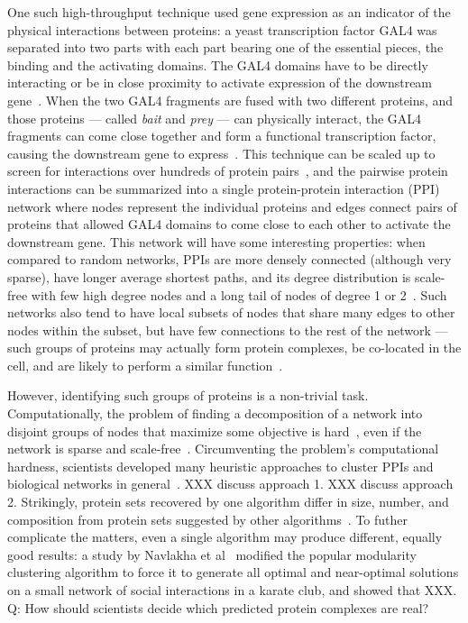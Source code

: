 One such high-throughput technique used gene expression as an indicator of the physical interactions between proteins: a yeast transcription factor GAL4 was separated into two parts with each part bearing one of the essential pieces, the binding and the activating domains. The GAL4 domains have to be directly interacting or be in close proximity to activate expression of the downstream gene~\cite{XXX}. When the two GAL4 fragments are fused with two different proteins, and those proteins --- called \textit{bait} and \textit{prey} --- can physically interact, the GAL4 fragments can come close together and form a functional transcription factor, causing the downstream gene to express~\cite{XXX}. This technique can be scaled up to screen for interactions over hundreds of protein pairs~\cite{Ito2001}, and the pairwise protein interactions can be summarized into a single protein-protein interaction (PPI) network where nodes represent the individual proteins and edges connect pairs of proteins that allowed GAL4 domains to come close to each other to activate the downstream gene. This network will have some interesting properties: when compared to random networks, PPIs are more densely connected (although very sparse), have longer average shortest paths, and its degree distribution is scale-free with few high degree nodes and a long tail of nodes of degree 1 or 2~\cite{Zhu2007}. Such networks also tend to have local subsets of nodes that share many edges to other nodes within the subset, but have few connections to the rest of the network --- such groups of proteins may actually form protein complexes, be co-located in the cell, and are likely to perform a similar function~\cite{ProteinComplexesPPI}.



However, identifying such groups of proteins is a non-trivial task. Computationally, the problem of finding a decomposition of a network into disjoint groups of nodes that maximize some objective is hard~\cite{ModularityNPhard}, even if the network is sparse and scale-free~\cite{XXX}. Circumventing the problem's computational hardness, scientists developed many heuristic approaches to cluster PPIs and biological networks in general~\cite{ReviewBiologicalNetworksclustering}. XXX discuss approach 1. XXX discuss approach 2. Strikingly, protein sets recovered by one algorithm differ in size, number, and composition from protein sets suggested by other algorithms~\cite{blah}. To futher complicate the matters, even a single algorithm may produce different, equally good results: a study by Navlakha et al~\cite{SaketModularity} modified the popular modularity~\cite{Girwan2002} clustering algorithm to force it to generate all optimal and near-optimal solutions on a small network of social interactions in a karate club, and showed that XXX. Q: How should scientists decide which predicted protein complexes are real?

